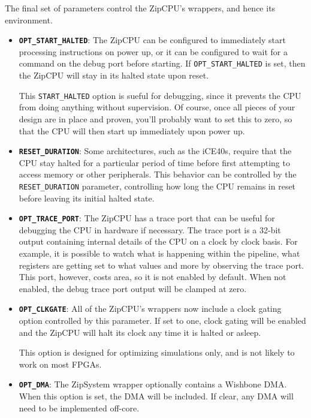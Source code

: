 \documentclass{gqtekspec}
\begin{document}
The final set of parameters control the ZipCPU's wrappers, and hence its
environment.
\begin{itemize} \item {\bf\tt OPT\_START\_HALTED}: The ZipCPU can be configured
	to immediately start processing instructions on power up, or it can be
	configured to wait for a command on the debug port before starting.
	If {\tt OPT\_START\_HALTED} is set, then the ZipCPU will stay in its
	halted state upon reset.

	This {\tt START\_HALTED} option is sueful for debugging, since it
	prevents the CPU from doing anything without supervision.  Of course,
	once all pieces of your design are in place and proven, you'll probably
	want to set this to zero, so that the CPU will then start up
	immediately upon power up.

\item {\bf\tt RESET\_DURATION}: Some architectures, such as the iCE40s,
	require that the CPU stay halted for a particular period of time
	before first attempting to access memory or other peripherals.  This
	behavior can be controlled by the {\tt RESET\_DURATION} parameter,
	controlling how long the CPU remains in reset before leaving its
	initial halted state.

\item {\bf\tt OPT\_TRACE\_PORT}: The ZipCPU has a trace port that can be useful
	for debugging the CPU in hardware if necessary.  The trace port is
	a 32-bit output containing internal details of the CPU on a clock by
	clock basis.  For example, it is possible to watch what is happening
	within the pipeline, what registers are getting set to what values and
	more by observing the trace port.  This port, however, costs area,
	so it is not enabled by default.  When not enabled, the debug trace
	port output will be clamped at zero.

\item {\bf\tt OPT\_CLKGATE}: All of the ZipCPU's wrappers now include a clock
	gating option controlled by this parameter.  If set to one, clock
	gating will be enabled and the ZipCPU will halt its clock any
	time it is halted or asleep.

	This option is designed for optimizing simulations only, and is not
	likely to work on most FPGAs.

\item {\bf\tt OPT\_DMA}: The ZipSystem wrapper optionally contains a Wishbone
	DMA.  When this option is set, the DMA will be included.  If clear,
	any DMA will need to be implemented off-core.


\end{itemize}
\end{document}
